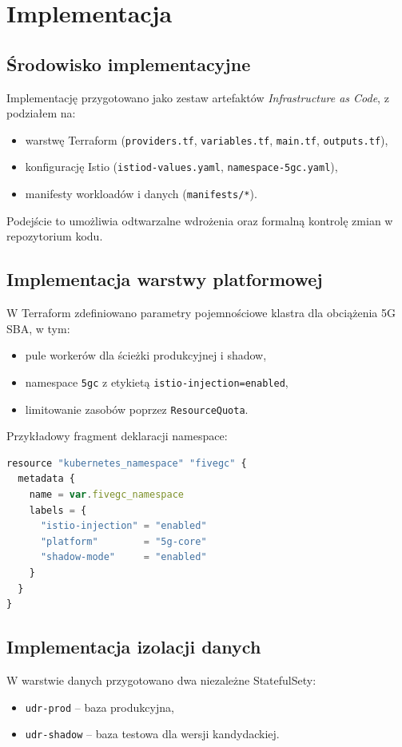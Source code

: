 \chapter{Implementacja}

\section{Środowisko implementacyjne}
Implementację przygotowano jako zestaw artefaktów \emph{Infrastructure as Code}, z podziałem na:
\begin{itemize}
    \item warstwę Terraform (\texttt{providers.tf}, \texttt{variables.tf}, \texttt{main.tf}, \texttt{outputs.tf}),
    \item konfigurację Istio (\texttt{istiod-values.yaml}, \texttt{namespace-5gc.yaml}),
    \item manifesty workloadów i danych (\texttt{manifests/*}).
\end{itemize}

Podejście to umożliwia odtwarzalne wdrożenia oraz formalną kontrolę zmian w repozytorium kodu.

\section{Implementacja warstwy platformowej}
W Terraform zdefiniowano parametry pojemnościowe klastra dla obciążenia 5G SBA, w tym:
\begin{itemize}
    \item pule workerów dla ścieżki produkcyjnej i shadow,
    \item namespace \texttt{5gc} z etykietą \texttt{istio-injection=enabled},
    \item limitowanie zasobów poprzez \texttt{ResourceQuota}.
\end{itemize}

Przykładowy fragment deklaracji namespace:
\begin{lstlisting}[language=JavaScript,style=JavaScriptStyle,caption=Definicja namespace z auto-injection,label=lst:ns-5gc]
resource "kubernetes_namespace" "fivegc" {
  metadata {
    name = var.fivegc_namespace
    labels = {
      "istio-injection" = "enabled"
      "platform"        = "5g-core"
      "shadow-mode"     = "enabled"
    }
  }
}
\end{lstlisting}

\section{Implementacja izolacji danych}
W warstwie danych przygotowano dwa niezależne StatefulSety:
\begin{itemize}
    \item \texttt{udr-prod} -- baza produkcyjna,
    \item \texttt{udr-shadow} -- baza testowa dla wersji kandydackiej.
\end{itemize}

